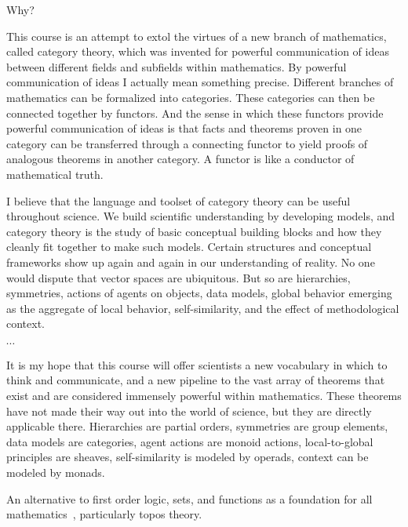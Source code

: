 \begin{plSection}{Why?}
\begin{plQuote}
{}
{}
This course is an attempt to extol the virtues of a new branch of mathematics,
called category theory, which was invented for powerful communication of ideas between
different fields and subfields within mathematics. By powerful communication of ideas I
actually mean something precise. Different branches of mathematics can be formalized
into categories. These categories can then be connected together by functors. And the
sense in which these functors provide powerful communication of ideas is that facts and
theorems proven in one category can be transferred through a connecting functor to
yield proofs of analogous theorems in another category. A functor is like a conductor of
mathematical truth.
\par
I believe that the language and toolset of category theory can be useful throughout
science. We build scientific understanding by developing models, and category theory is
the study of basic conceptual building blocks and how they cleanly fit together to make
such models. Certain structures and conceptual frameworks show up again and again in
our understanding of reality. No one would dispute that vector spaces are ubiquitous.
But so are hierarchies, symmetries, actions of agents on objects, data models, global
behavior emerging as the aggregate of local behavior, self-similarity, and the effect of
methodological context.
\par
$\cdots$
\par
It is my hope that this course will offer scientists a new vocabulary in which to think
and communicate, and a new pipeline to the vast array of theorems that exist and are
considered immensely powerful within mathematics. These theorems have not made their
way out into the world of science, but they are directly applicable there. Hierarchies are
partial orders, symmetries are group elements, data models are categories, agent actions
are monoid actions, local-to-global principles are sheaves, self-similarity is modeled by
operads, context can be modeled by monads.
\end{plQuote}

An alternative to first order logic, sets, 
and functions as a foundation for all
mathematics~\cite{Feferman:1977:CategoricalFoundations},  
particularly topos theory.

\end{plSection}%
